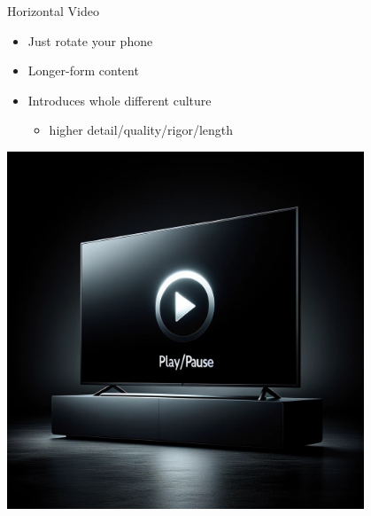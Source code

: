 \documentclass[aspectratio=35]{beamer} %
\begin{document}
\begin{frame}{Horizontal Video}
\vspace{-0.6in}
\begin{itemize}
    \item Just rotate your phone
        \item Longer-form content
        \item Introduces whole different culture
        \begin{itemize}
            \item higher detail/quality/rigor/length
        \end{itemize}
\end{itemize}
\centering
\includegraphics[width=0.8\textwidth]{imgs/media/horizontal_vid.jpeg}
\end{frame}
\end{document}
